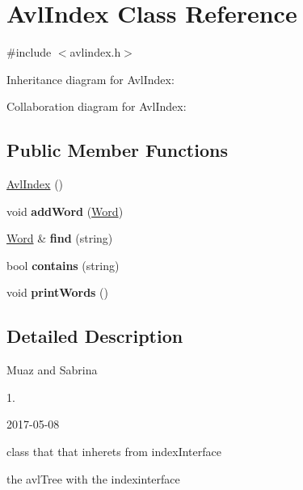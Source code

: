 \hypertarget{classAvlIndex}{}\section{Avl\+Index Class Reference}
\label{classAvlIndex}


{\ttfamily \#include $<$avlindex.\+h$>$}



Inheritance diagram for Avl\+Index\+:


Collaboration diagram for Avl\+Index\+:
\subsection*{Public Member Functions}
\begin{DoxyCompactItemize}
\item 
\hyperlink{classAvlIndex_a002685410c4f74c1f06ed4f5b2a8184a}{Avl\+Index} ()
\item 
void {\bfseries add\+Word} (\hyperlink{classWord}{Word})\hypertarget{classAvlIndex_a94ee522a07201e81a20a3f2d0d2c6f58}{}\label{classAvlIndex_a94ee522a07201e81a20a3f2d0d2c6f58}

\item 
\hyperlink{classWord}{Word} \& {\bfseries find} (string)\hypertarget{classAvlIndex_a99d4501d5d46920e56b0f240ae21cbd1}{}\label{classAvlIndex_a99d4501d5d46920e56b0f240ae21cbd1}

\item 
bool {\bfseries contains} (string)\hypertarget{classAvlIndex_aec0dd92b0b25616045c1d8333dc9f018}{}\label{classAvlIndex_aec0dd92b0b25616045c1d8333dc9f018}

\item 
void {\bfseries print\+Words} ()\hypertarget{classAvlIndex_abe192b20df664c06db21841fbb291a98}{}\label{classAvlIndex_abe192b20df664c06db21841fbb291a98}

\end{DoxyCompactItemize}


\subsection{Detailed Description}
Muaz and Sabrina

1.

2017-\/05-\/08

class that that inherets from index\+Interface

the avl\+Tree with the indexinterface 


